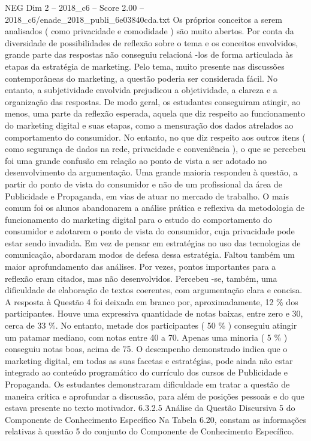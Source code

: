 \begin{textsample}{NEG Dim 2 – 2018\_c6 – Score 2.00 – 2018\_c6/enade\_2018\_publi\_6e03840cda.txt}
Os próprios conceitos a serem analisados ( como privacidade e comodidade ) são muito abertos.
Por conta da diversidade de possibilidades de reflexão sobre o tema e os conceitos envolvidos, grande parte das respostas não conseguiu relacioná -los de forma articulada às etapas da estratégia de marketing.
Pelo tema, muito presente nas discussões contemporâneas do marketing, a questão poderia ser considerada fácil.
No entanto, a subjetividade envolvida prejudicou a objetividade, a clareza e a organização das respostas.
De modo geral, os estudantes conseguiram atingir, ao menos, uma parte da reflexão esperada, aquela que diz respeito ao funcionamento do marketing digital e suas etapas, como a mensuração dos dados atrelados ao comportamento do consumidor.
No entanto, no que diz respeito aos outros itens ( como segurança de dados na rede, privacidade e conveniência ), o que se percebeu foi uma grande confusão em relação ao ponto de vista a ser adotado no desenvolvimento da argumentação.
Uma grande maioria respondeu à questão, a partir do ponto de vista do consumidor e não de um profissional da área de Publicidade e Propaganda, em vias de atuar no mercado de trabalho.
O mais comum foi os alunos abandonarem a análise prática e reflexiva da metodologia de funcionamento do marketing digital para o estudo do comportamento do consumidor e adotarem o ponto de vista do consumidor, cuja privacidade pode estar sendo invadida.
Em vez de pensar em estratégias no uso das tecnologias de comunicação, abordaram modos de defesa dessa estratégia.
Faltou também um maior aprofundamento das análises.
Por vezes, pontos importantes para a reflexão eram citados, mas não desenvolvidos.
Percebeu -se, também, uma dificuldade de elaboração de textos coerentes, com argumentação clara e concisa.
A resposta à Questão 4 foi deixada em branco por, aproximadamente, 12 \% dos participantes.
Houve uma expressiva quantidade de notas baixas, entre zero e 30, cerca de 33 \%.
No entanto, metade dos participantes ( 50 \% ) conseguiu atingir um patamar mediano, com notas entre 40 a 70.
Apenas uma minoria ( 5 \% ) conseguiu notas boas, acima de 75.
O desempenho demonstrado indica que o marketing digital, em todas as suas facetas e estratégias, pode ainda não estar integrado ao conteúdo programático do currículo dos cursos de Publicidade e Propaganda.
Os estudantes demonstraram dificuldade em tratar a questão de maneira crítica e aprofundar a discussão, para além de posições pessoais e do que estava presente no texto motivador. 6.3.2.5 Análise da Questão Discursiva 5 do Componente de Conhecimento Específico Na Tabela 6.20, constam as informações relativas à questão 5 do conjunto do Componente de Conhecimento Específico.

\end{textsample}
